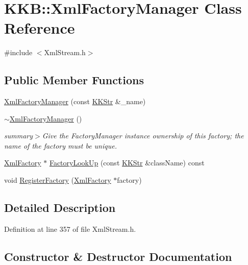 \hypertarget{class_k_k_b_1_1_xml_factory_manager}{}\section{K\+KB\+:\+:Xml\+Factory\+Manager Class Reference}
\label{class_k_k_b_1_1_xml_factory_manager}


{\ttfamily \#include $<$Xml\+Stream.\+h$>$}

\subsection*{Public Member Functions}
\begin{DoxyCompactItemize}
\item 
\hyperlink{class_k_k_b_1_1_xml_factory_manager_af85fa62ba12b89ab9763bc27a5975a49}{Xml\+Factory\+Manager} (const \hyperlink{class_k_k_b_1_1_k_k_str}{K\+K\+Str} \&\+\_\+name)
\item 
\hyperlink{class_k_k_b_1_1_xml_factory_manager_a8fde108a1612609a25a7f9b48d8d9b86}{$\sim$\+Xml\+Factory\+Manager} ()
\begin{DoxyCompactList}\small\item\em summary$>$Give the Factory\+Manager instance ownership of this factory; the name of the factory must be unique.\end{DoxyCompactList}\item 
\hyperlink{class_k_k_b_1_1_xml_factory}{Xml\+Factory} $\ast$ \hyperlink{class_k_k_b_1_1_xml_factory_manager_a7c7d895707b8522ec9cfbed3da81416d}{Factory\+Look\+Up} (const \hyperlink{class_k_k_b_1_1_k_k_str}{K\+K\+Str} \&class\+Name) const 
\item 
void \hyperlink{class_k_k_b_1_1_xml_factory_manager_aa7e53d487f55e36b0a224ccc3286d740}{Register\+Factory} (\hyperlink{class_k_k_b_1_1_xml_factory}{Xml\+Factory} $\ast$factory)
\end{DoxyCompactItemize}


\subsection{Detailed Description}


Definition at line 357 of file Xml\+Stream.\+h.



\subsection{Constructor \& Destructor Documentation}
